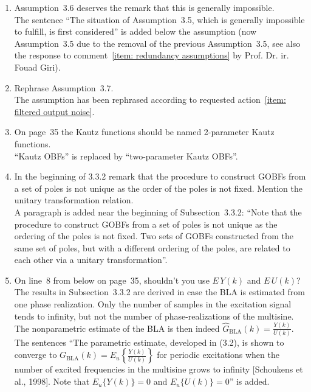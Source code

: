 \documentclass{article}
\newenvironment{answer}{\noindent\ignorespaces\color{blue}}{\noindent\ignorespacesafterend}
\newcommand{\ans}[1]{\begin{answer}#1\end{answer}}
\newcommand{\oldnewpage}[2]{\marginpar{{\color{black}#1} / {\color{red}#2}}}
\begin{document}
\begin{enumerate}
	\item \label{item: no noise}
		Assumption~3.6 deserves the remark that this is generally impossible.\\
		\ans{\oldnewpage{33}{37}The sentence ``The situation of Assumption~3.5, which is generally impossible to fulfill, is first considered'' is added below the assumption (now Assumption~3.5 due to the removal of the previous Assumption~3.5, see also the response to comment~\ref{item: redundancy assumptions} by Prof. Dr. ir. Fouad Giri).}
	\item Rephrase Assumption~3.7.\\
		\ans{The assumption has been rephrased according to requested action~\ref{item: filtered output noise}.}
	\item On page~35 the Kautz functions should be named 2-parameter Kautz functions.\\
		\ans{\oldnewpage{35}{39}``Kautz OBFs'' is replaced by ``two-parameter Kautz OBFs''.}
	\item In the beginning of 3.3.2 remark that the procedure to construct GOBFs from a set of poles is not unique as the order of the poles is not fixed. Mention the unitary transformation relation.\\
		\ans{\oldnewpage{35}{39}A paragraph is added near the beginning of Subsection~3.3.2: ``Note that the procedure to construct GOBFs from a set of poles is not unique as the ordering of the poles is not fixed. Two sets of GOBFs constructed from the same set of poles, but with a different ordering of the poles, are related to each other via a unitary transformation''.}
	\item On line~8 from below on page~35, shouldn't you use \mbox{$E\, Y(k)$} and \mbox{$E\, U(k)$}?\\
		\ans{The results in Subsection~3.3.2 are derived in case the BLA is estimated from one phase realization. Only the number of samples in the excitation signal tends to infinity, but not the number of phase-realizations of the multisine. \\ The nonparametric estimate of the BLA is then indeed \mbox{$\hat{G}_\mathrm{BLA}(k) = \frac{Y(k)}{U(k)}$}.\\ \oldnewpage{35}{39--40}The sentences ``The parametric estimate, developed in (3.2), is shown to converge to \mbox{$G_\mathrm{BLA}(k) = E_u\left\{ \frac{Y(k)}{U(k)} \right\}$} for periodic excitations when the number of excited frequencies in the multisine grows to infinity [Schoukens et al., 1998]. Note that \mbox{$E_u\{Y(k)\} = 0$} and \mbox{$E_u\{U(k)\} = 0$}'' is added.}

\end{enumerate}
\end{document}
